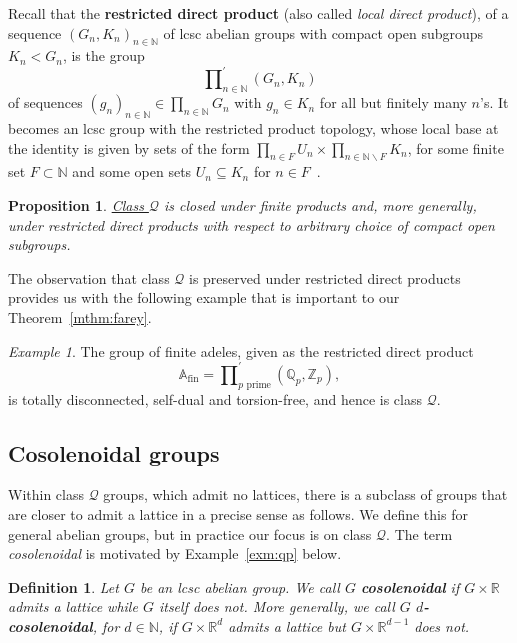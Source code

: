 \documentclass{amsart}
\numberwithin{equation}{subsection}
\newtheorem{prop}[thm]{Proposition}
\newtheorem{defn}[thm]{Definition}
\theoremstyle{remark}
\newtheorem{exm}[thm]{Example}
\begin{document}
Recall that the {\bf restricted direct product} (also called \emph{local direct product}), of a sequence \(\left(G_{n},K_{n}\right)_{n\in\mathbb{N}}\) of lcsc abelian groups with compact open subgroups \(K_{n}<G_{n}\), is the group
\[\prod\nolimits_{n\in\mathbb{N}}^{\prime}\left(G_{n},K_{n}\right)\]
of sequences \(\left(g_{n}\right)_{n\in\mathbb{N}}\in \prod\nolimits_{n\in\mathbb{N}}G_{n}\) with \(g_{n}\in K_{n}\) for all but finitely many \(n\)'s. It becomes an lcsc group with the restricted product topology, whose local base at the identity is given by sets of the form \(\prod\nolimits_{n\in F}U_{n}\times\prod\nolimits_{n\in \mathbb{N}\backslash F}K_{n}\), for some finite set \(F\subset\mathbb{N}\) and some open sets \(U_{n}\subseteq K_{n}\) for \(n\in F\)~\cite[(6.16)]{HewittRoss}.

\begin{prop}\label{prop:classqclass}
\hyperlink{classQ}{Class \(\mathcal{Q}\)} is closed under finite products and, more generally, under restricted direct products with respect to arbitrary choice of compact open subgroups.
\end{prop}



The observation that class \(\mathcal{Q}\) is preserved under restricted direct products provides us with the following example that is important to our Theorem~\ref{mthm:farey}.

\begin{exm}\label{exm:adeles}
The group of finite adeles, given as the restricted direct product
\[\mathbb{A}_{\mathrm{fin}}=\prod\nolimits_{p\text{ prime}}^{\prime}\left(\mathbb{Q}_{p},\mathbb{Z}_{p}\right),\]
is totally disconnected, self-dual and torsion-free, and hence is class \(\mathcal{Q}\).
\end{exm}

\subsection{Cosolenoidal groups}\label{sct:coso}

Within class \(\mathcal{Q}\) groups, which admit no lattices, there is a subclass of groups that are closer to admit a lattice in a precise sense as follows. We define this for general abelian groups, but in practice our focus is on class \(\mathcal{Q}\). The term \emph{cosolenoidal} is motivated by Example~\ref{exm:qp} below.

\begin{defn}
Let \(G\) be an lcsc abelian group.  
We call \(G\) \textbf{cosolenoidal} if \(G\times\mathbb{R}\) admits a lattice while \(G\) itself does not. More generally, we call \(G\) \textbf{$d$-cosolenoidal}, for \(d\in\mathbb{N}\), if \(G \times \mathbb{R}^{d}\) admits a lattice but \(G \times \mathbb{R}^{d-1}\) does not.
\end{defn}
\end{document}
